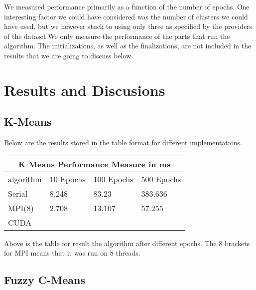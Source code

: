 \begin{multicols*}{2}
    We measured performance primarily as a function of the number of epochs. One interesting factor we could have considered was the number of clusters we could have used, but we however stuck to using only three as specified by the providers of the dataset.We only measure the performance of the parts that run the algorithm. The initializations, as well as the finalizations, are not included in the results that we are going to discuss below.


    \section{Results and Discusions}
    \subsection{K-Means}
    Below are the results stored in the table format for different implementations.
    

    \begin{tabular}{ |p{2cm}||p{1.2cm}|p{1.2cm}|p{1.2cm}|  }
        \hline
        \multicolumn{4}{|c|}{K Means Performance Measure in ms} \\
        \hline
        algorithm& 10 Epochs &100 Epochs&500 Epochs\\
        \hline
        Serial  &  8.248    &    83.23   &  383.636 \\
        MPI(8)     &   2.708    &    13.107   & 57.255  \\
        CUDA    &       &       &   \\
        \hline
    \end{tabular}

    Above is the table for result the algorithm after different epochs. The $8$ brackets for MPI means that it was run on $8$ threads.


    \subsection{Fuzzy C-Means}



\end{multicols*}


